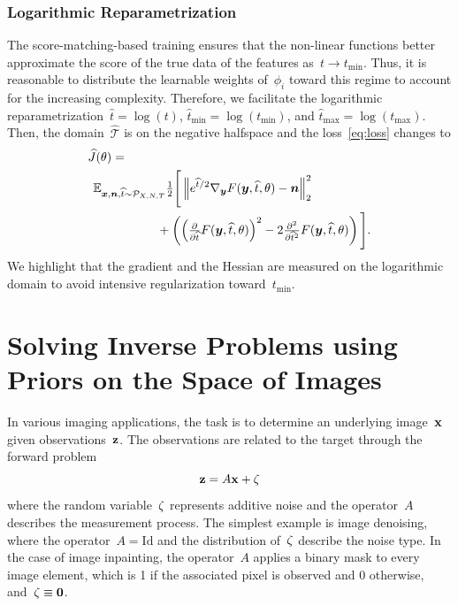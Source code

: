 \documentclass[nohyperref]{article}
\newcommand{\T}{\mathcal{T}}
\newcommand{\id}{\mathrm{Id}}
\newcommand{\norm}[1]{\left\Vert#1\right\Vert}
\renewcommand{\vec}[1]{\mathbf{#1}}
\newcommand{\tmin}{t_\mathrm{min}}
\newcommand{\tmax}{t_\mathrm{max}}
\def\hatt{{\widehat{t}}}
\newcommand{\tminh}{\hatt_\mathrm{min}}
\newcommand{\tmaxh}{\hatt_\mathrm{max}}
\newcommand{\dist}[1]{\mathcal{P}_{#1}}
\theoremstyle{plain}
\theoremstyle{definition}
\theoremstyle{remark}
\begin{document}
\subsubsection{Logarithmic Reparametrization}
The score-matching-based training ensures that the non-linear functions better approximate the score of the true data of the features as~$t\to\tmin$.
Thus, it is reasonable to distribute the learnable weights of~$\phi_i$ toward this regime to account for the increasing complexity.
Therefore, we facilitate the logarithmic reparametrization~$\widehat{t}=\log(t)$, $\tminh=\log(\tmin)$, and $\tmaxh=\log(\tmax)$.
Then, the domain~$\widehat{\T}$ is on the negative halfspace and the loss~\eqref{eq:loss} changes to
\begin{align} \label{eq:losslog}
&\widehat{J}(\theta)=\\
&\hspace{1ex}\E_{\vx,\vn,\widehat{t}\sim\dist{X,N,T}}\tfrac12\Bigg[\norm{e^{\widehat{t}/2}\nabla_\vy F(\vy,\widehat{t},\theta) -\vn}_2^2 \notag\\
&\hspace{13ex}+ \left(\left(\tfrac{\partial}{\partial\widehat{t}}F(\vy,\widehat{t},\theta)\right)^2 -2\tfrac{\partial^2}{\partial \widehat{t}^2}F(\vy,\widehat{t},\theta)\right)\Bigg]. \notag
\end{align}
We highlight that the gradient and the Hessian are measured on the logarithmic domain to avoid intensive regularization toward~$\tmin$.


\section{Solving Inverse Problems using Priors on the Space of Images}
In various imaging applications, the task is to determine an underlying image~${\mathbf{x}}$ given observations~${\mathbf{z}}$.
The observations are related to the target through the forward problem
\[
{\mathbf{z}} = A {\mathbf{x}} + {\mathbf{\zeta}}
\]
where the random variable~${\mathbf{\zeta}}$ represents additive noise and the operator~$A$ describes the measurement process.
The simplest example is image denoising, where the operator~$A=\id$ and the distribution of~${\mathbf{\zeta}}$ describe the noise type.
In the case of image inpainting, the operator~$A$ applies a binary mask to every image element, which is 1 if the associated pixel is observed and 0 otherwise, and~$\rvzeta\equiv\vec{0}$.
\end{document}
